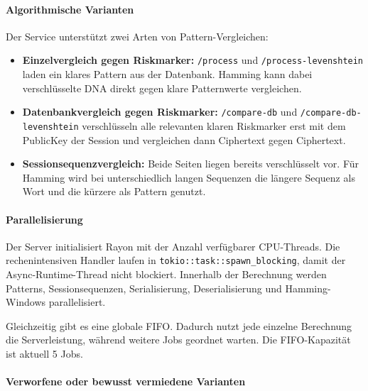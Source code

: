 \paragraph{Algorithmische Varianten}\label{algorithmische-varianten}

Der Service unterstützt zwei Arten von Pattern-Vergleichen:

\begin{itemize}
\item
  \textbf{Einzelvergleich gegen Riskmarker:} \texttt{/process} und
  \texttt{/process-levenshtein} laden ein klares Pattern aus der
  Datenbank. Hamming kann dabei verschlüsselte DNA direkt gegen klare
  Patternwerte vergleichen.
\item
  \textbf{Datenbankvergleich gegen Riskmarker:} \texttt{/compare-db} und
  \texttt{/compare-db-levenshtein} verschlüsseln alle relevanten klaren
  Riskmarker erst mit dem PublicKey der Session und vergleichen dann
  Ciphertext gegen Ciphertext.
\item
  \textbf{Sessionsequenzvergleich:} Beide Seiten liegen bereits
  verschlüsselt vor. Für Hamming wird bei unterschiedlich langen
  Sequenzen die längere Sequenz als Wort und die kürzere als Pattern
  genutzt.
\end{itemize}

\paragraph{Parallelisierung}\label{parallelisierung}

Der Server initialisiert Rayon mit der Anzahl verfügbarer CPU-Threads.
Die rechenintensiven Handler laufen in
\texttt{tokio::task::spawn\_blocking}, damit der Async-Runtime-Thread
nicht blockiert. Innerhalb der Berechnung werden Patterns,
Sessionsequenzen, Serialisierung, Deserialisierung und Hamming-Windows
parallelisiert.

Gleichzeitig gibt es eine globale FIFO. Dadurch nutzt jede einzelne Berechnung die Serverleistung,
während weitere Jobs geordnet warten. Die FIFO-Kapazität ist aktuell 5
Jobs.

\paragraph{Verworfene oder bewusst vermiedene
Varianten}\label{verworfene-oder-bewusst-vermiedene-varianten}

